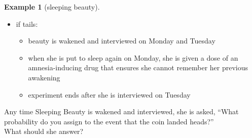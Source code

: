 \documentclass{beamer}    %
\theoremstyle{plain}
\theoremstyle{definition}
\newtheorem{ex}{Example}
\begin{document}
{\begin{ex}[sleeping beauty]
\begin{itemize}
\begin{itemize}
    \item  if tails:
      \begin{itemize}
      \item beauty is wakened and interviewed on Monday and Tuesday
      \item when she is put to sleep again on Monday, she is given a
        dose of an amnesia-inducing drug that ensures she cannot
        remember her previous awakening
      \item experiment ends after she is interviewed on Tuesday
      \end{itemize}
    \end{itemize}
    Any time Sleeping Beauty is wakened and interviewed, she is
    asked, ``What probability do you assign to the event that the
    coin landed heads?''\\
What should she answer?%
  \end{itemize}
\end{ex}

}
\end{document}

